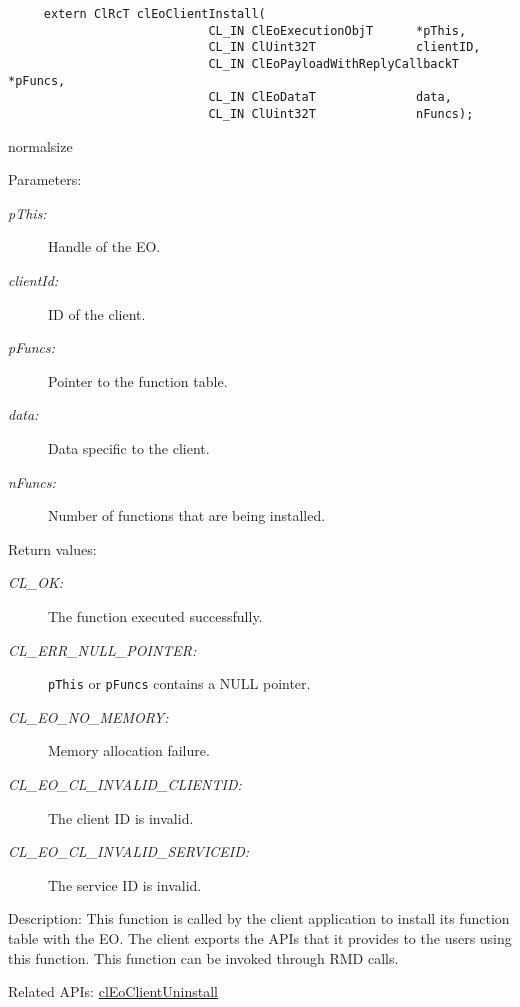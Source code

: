 \begin{flushleft}
\begin{Desc}
\footnotesize\begin{verbatim}     extern ClRcT clEoClientInstall(
                 			CL_IN ClEoExecutionObjT      *pThis,
                 			CL_IN ClUint32T              clientID,
                 			CL_IN ClEoPayloadWithReplyCallbackT *pFuncs,
                 			CL_IN ClEoDataT              data,
                 			CL_IN ClUint32T              nFuncs);
\end{verbatim}
  normalsize
\end{Desc}
\begin{Desc}
\item[Parameters:]
\begin{description}
\item[{\em p\-This:}]Handle of the EO. 
\item[{\em client\-Id:}]ID of the client.   
\item[{\em p\-Funcs:}]Pointer to the function table. 
\item[{\em data:}]Data specific to the client.
\item[{\em n\-Funcs:}]Number of functions that are being installed.\end{description}
\end{Desc}
\begin{Desc}
\item[Return values:]
\begin{description}
\item[{\em CL\_\-OK:}]The function executed successfully. 
\item[{\em CL\_\-ERR\_\-NULL\_\-POINTER:}]{\tt{pThis}} or {\tt{pFuncs}} contains a NULL pointer. 
\item[{\em CL\_\-EO\_\-NO\_\-MEMORY:}]Memory allocation failure. 
\item[{\em CL\_\-EO\_\-CL\_\-INVALID\_\-CLIENTID:}]The client ID is invalid. 
\item[{\em CL\_\-EO\_\-CL\_\-INVALID\_\-SERVICEID:}]The service ID is invalid.\end{description}
\end{Desc}
\begin{Desc}
\item[Description:]This function is called by the client application to install its function table with the EO. The client exports
the APIs that it provides to the users using this function. This function can be invoked through RMD calls.
\end{Desc}
\begin{Desc}
\item[Related APIs:]\hyperlink{pageeo107}{cl\-Eo\-Client\-Uninstall} \end{Desc}



\end{flushleft}
